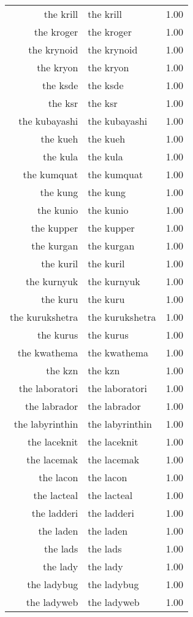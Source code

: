 \begin{table}[ht]
\begin{tabular}{rlr}
  the krill & the krill & 1.00 \\ 
  the kroger & the kroger & 1.00 \\ 
  the krynoid & the krynoid & 1.00 \\ 
  the kryon & the kryon & 1.00 \\ 
  the ksde & the ksde & 1.00 \\ 
  the ksr & the ksr & 1.00 \\ 
  the kubayashi & the kubayashi & 1.00 \\ 
  the kueh & the kueh & 1.00 \\ 
  the kula & the kula & 1.00 \\ 
  the kumquat & the kumquat & 1.00 \\ 
  the kung & the kung & 1.00 \\ 
  the kunio & the kunio & 1.00 \\ 
  the kupper & the kupper & 1.00 \\ 
  the kurgan & the kurgan & 1.00 \\ 
  the kuril & the kuril & 1.00 \\ 
  the kurnyuk & the kurnyuk & 1.00 \\ 
  the kuru & the kuru & 1.00 \\ 
  the kurukshetra & the kurukshetra & 1.00 \\ 
  the kurus & the kurus & 1.00 \\ 
  the kwathema & the kwathema & 1.00 \\ 
  the kzn & the kzn & 1.00 \\ 
  the laboratori & the laboratori & 1.00 \\ 
  the labrador & the labrador & 1.00 \\ 
  the labyrinthin & the labyrinthin & 1.00 \\ 
  the laceknit & the laceknit & 1.00 \\ 
  the lacemak & the lacemak & 1.00 \\ 
  the lacon & the lacon & 1.00 \\ 
  the lacteal & the lacteal & 1.00 \\ 
  the ladderi & the ladderi & 1.00 \\ 
  the laden & the laden & 1.00 \\ 
  the lads & the lads & 1.00 \\ 
  the lady & the lady & 1.00 \\ 
  the ladybug & the ladybug & 1.00 \\ 
  the ladyweb & the ladyweb & 1.00 \\ 

\end{tabular}
\end{table}
